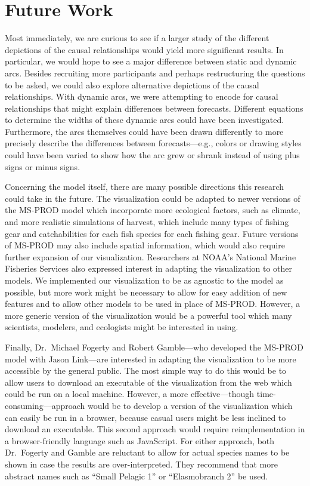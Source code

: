 \section{Future Work}

Most immediately, we are curious to see if a larger study of the different depictions of the causal relationships would yield more significant results.  In particular, we would hope to see a major difference between static and dynamic arcs.  Besides recruiting more participants and perhaps restructuring the questions to be asked, we could also explore alternative depictions of the causal relationships.  With dynamic arcs, we were attempting to encode for causal relationships that might explain differences between forecasts.  Different equations to determine the widths of these dynamic arcs could have been investigated.  Furthermore, the arcs themselves could have been drawn differently to more precisely describe the differences between forecasts---e.g., colors or drawing styles could have been varied to show how the arc grew or shrank instead of using plus signs or minus signs.

Concerning the model itself, there are many possible directions this research could take in the future.  The visualization could be adapted to newer versions of the MS-PROD model which incorporate more ecological factors, such as climate, and more realistic simulations of harvest, which include many types of fishing gear and catchabilities for each fish species for each fishing gear.  Future versions of MS-PROD may also include spatial information, which would also require further expansion of our visualization.  Researchers at NOAA's National Marine Fisheries Services also expressed interest in adapting the visualization to other models.  We implemented our visualization to be as agnostic to the model as possible, but more work might be necessary to allow for easy addition of new features and to allow other models to be used in place of MS-PROD.  However, a more generic version of the visualization would be a powerful tool which many scientists, modelers, and ecologists might be interested in using.

Finally, Dr.\ Michael Fogerty and Robert Gamble---who developed the MS-PROD model with Jason Link---are interested in adapting the visualization to be more accessible by the general public.  The most simple way to do this would be to allow users to download an executable of the visualization from the web which could be run on a local machine.  However, a more effective---though time-consuming---approach would be to develop a version of the visualization which can easily be run in a browser, because casual users might be less inclined to download an executable.  This second approach would require reimplementation in a browser-friendly language such as JavaScript.  For either approach, both Dr.\ Fogerty and Gamble are reluctant to allow for actual species names to be shown in case the results are over-interpreted.  They recommend that more abstract names such as ``Small Pelagic 1''  or ``Elasmobranch 2'' be used.
